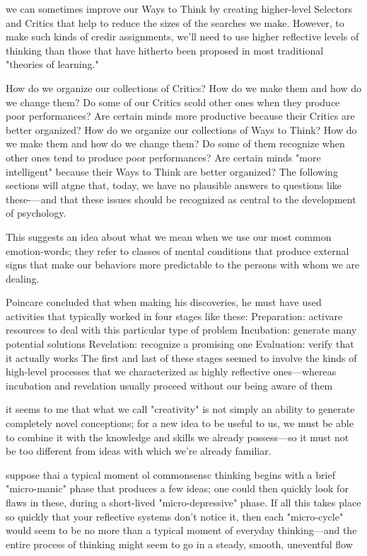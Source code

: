 \documentclass[10pt,a4paper]{article}
\begin{document}
we can sometimes improve our Ways to Think by creating higher-level Selectors and Critics that help to reduce the sizes of the searches we make. However, to make such kinds of credir assignments, we'll need to use higher reflective levels of thinking than those that have hitherto been proposed in most traditional "theories of learning." \cite[p.~232]{minsky}

How do we organize our collections of Critics? How do we make them and how do we change them? Do some of our Critics scold other ones when they produce poor performances? Are certain minds more productive because their Critics are better organized?
How do we organize our collections of Ways to Think? How do we make them and how do we change them? Do some of them recognize when other ones tend to produce poor performances? Are certain minds "more intelligent" because their Ways to Think are better organized?
The following sections will atgne that, today, we have no plausible answers to questions like these-—and that these issues should be recognized as central to the development of psychology. \cite[p.~232]{minsky}

This suggests an idea about what we mean when we use our most common emotion-words; they refer to classes of mental conditions that produce external signs that make our behaviors more predictable to the persons with whom we are dealing. \cite[p.~233]{minsky}

Poincare concluded that when making his discoveries, he must have used activities that typically worked in four stages like these:
Preparation: activare resources to deal with this particular type of problem
Incubation: generate many potential solutions
Revelation: recognize a promising one
Evaluation: verify that it actually works
The first and last of these stages seemed to involve the kinds of high-level processes that we characterized as highly reflective ones—whereas incubation and revelation usually proceed without our being aware of them \cite[p.~237]{minsky}

it seems to me that what we call "creativity" is not simply an ability to generate completely novel conceptions; for a new idea to be useful to us, we must be able to combine it with the knowledge and skills we already possess—so it must not be too different from ideas with which we're already familiar. \cite[p.~240]{minsky}

suppose thai a typical moment ol commonsensc thinking begins with a brief "micro-manic" phase that produces a few ideas; one could then quickly look for flaws in these, during a short-lived "micro-depressive" phase. If all this takes place so quickly that your reflective systems don't notice it, then each "micro-cycle" would seem to be no more than a typical moment of everyday thinking—and the entire process of thinking might seem to go in a steady, smooth, uneventful flow \cite[p.~241-242]{minsky}
\end{document}
